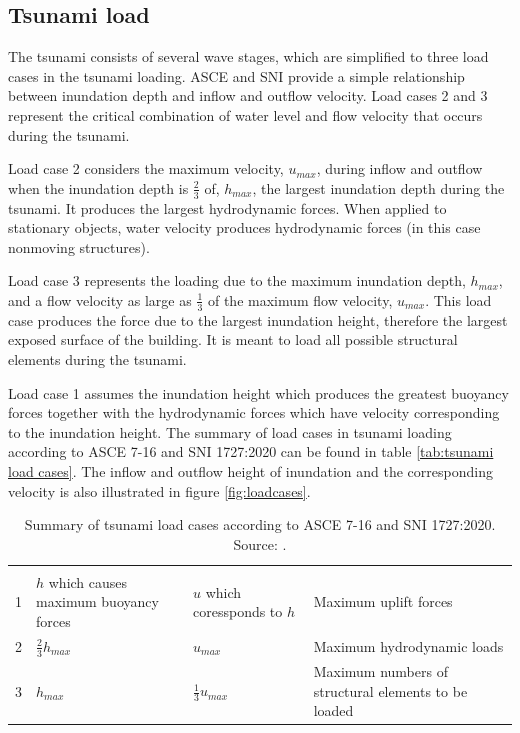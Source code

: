 \documentclass{cup-pan}
\begin{document}
\subsection{Tsunami load}
\label{subsec:tsunami load}

The tsunami consists of several wave stages, which are simplified to three load cases in the tsunami loading. ASCE and SNI provide a simple relationship between inundation depth and inflow and outflow velocity. Load cases 2 and 3 represent the critical combination of water level and flow velocity that occurs during the tsunami.

Load case 2 considers the maximum velocity, $u_{max}$, during inflow and outflow when the inundation depth is $\frac{2}{3}$ of, $h_{max}$, the largest inundation depth during the tsunami. It produces the largest hydrodynamic forces. When applied to stationary objects, water velocity produces hydrodynamic forces (in this case nonmoving structures).

Load case 3 represents the loading due to the maximum inundation depth, $h_{max}$, and a flow velocity as large as $\frac{1}{3}$ of the maximum flow velocity, $u_{max}$. This load case produces the force due to the largest inundation height, therefore the largest exposed surface of the building. It is meant to load all possible structural elements during the tsunami.

Load case 1 assumes the inundation height which produces the greatest buoyancy forces together with the hydrodynamic forces which have velocity corresponding to the inundation height. The summary of load cases in tsunami loading according to ASCE 7-16 and SNI 1727:2020 can be found in table \ref{tab:tsunami load cases}. The inflow and outflow height of inundation and the corresponding velocity is also illustrated in figure \ref{fig:loadcases}.

\label{tab:tsunami load cases}

\begin{longtable}{P{1in} P{1in} P{1in} P{1.5in}}
\caption{Summary of tsunami load cases according to ASCE 7-16 and SNI 1727:2020. Source: \cite{leet}.}\\

\headrow {} &  &  &  \\
1& $h$ which causes maximum buoyancy forces     & $u$ which coressponds to $h$ & Maximum uplift forces \\
2& $\frac{2}{3}h_{max}$     & $u_{max}$       & Maximum hydrodynamic loads         \\
3     & $h_{max}$      &   $\frac{1}{3}u_{max}$            & Maximum numbers of structural elements to be loaded  \\

\end{longtable}
\end{document}
